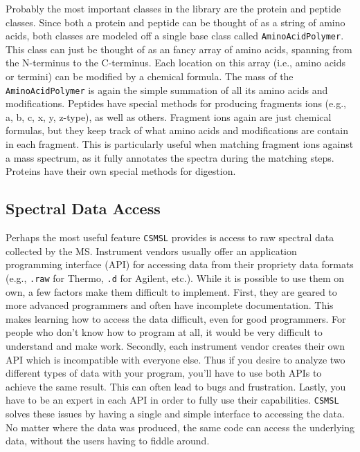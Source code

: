 Probably the most important classes in the library are the protein and peptide classes. Since both a protein and peptide can be thought of as a string of amino acids, both classes are modeled off a single base class called \texttt{AminoAcidPolymer}. This class can just be thought of as an fancy array of amino acids, spanning from the N-terminus to the C-terminus. Each location on this array (i.e., amino acids or termini) can be modified by a chemical formula. The mass of the \texttt{AminoAcidPolymer} is again the simple summation of all its amino acids and modifications. Peptides have special methods for producing fragments ions (e.g., a, b, c, x, y, z-type), as well as others. Fragment ions again are just chemical formulas, but they keep track of what amino acids and modifications are contain in each fragment. This is particularly useful when matching fragment ions against a mass spectrum, as it fully annotates the spectra during the matching steps. Proteins have their own special methods for digestion. 



\subsection*{Spectral Data Access}
Perhaps the most useful feature \texttt{CSMSL} provides is access to raw spectral data collected by the MS. Instrument vendors usually offer an application programming interface (API) for accessing data from their propriety data formats (e.g., \texttt{.raw} for Thermo, \texttt{.d} for Agilent, etc.). While it is possible to use them on own, a few factors make them difficult to implement. First, they are geared to more advanced programmers and often have incomplete documentation. This makes learning how to access the data difficult, even for good programmers. For people who don't know how to program at all, it would be very difficult to understand and make work. Secondly, each instrument vendor creates their own API which is incompatible with everyone else. Thus if you desire to analyze two different types of data with your program, you'll have to use both APIs to achieve the same result. This can often lead to bugs and frustration. Lastly, you have to be an expert in each API in order to fully use their capabilities. \texttt{CSMSL} solves these issues by having a single and simple interface to accessing the data. No matter where the data was produced, the same code can access the underlying data, without the users having to fiddle around. 

